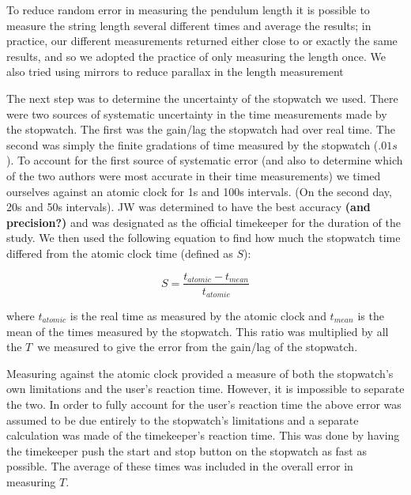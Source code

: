 \documentclass[iop]{emulateapj}
\def\T{$T$}
\begin{document}
To reduce random error in measuring the pendulum length 
it is possible to measure the string length several 
different times and average the results; in practice, our different 
measurements returned either close to or exactly the same results, and so 
we adopted the practice of only measuring the length once. We also tried using 
mirrors to reduce parallax in the length measurement

The next step was to determine the uncertainty of the stopwatch we used. 
There were two sources of systematic 
uncertainty in the time measurements made by the stopwatch.  The first was the 
gain/lag the stopwatch had over real time.  The second was simply the finite 
gradations of time measured by the stopwatch ($.01 s$).  To account for the 
first source of systematic error (and also to determine which of the two 
authors were most accurate in their time measurements) we timed 
ourselves against an atomic clock for 1s and 100s intervals.  (On the second
day, 20s and 50s intervals). JW 
was determined to have the best accuracy {\bf (and precision?)} and was 
designated as the official timekeeper for the duration of the study.  
We then used the following equation to find how much the stopwatch time
differed from the atomic clock time (defined as $S$):

\begin{equation}
\label{eq:S}
S=\frac{t_{atomic}-t_{mean}}{t_{atomic}} 
\end{equation}

where $t_{atomic}$ is the real time as measured by the 
atomic clock 
and $t_{mean}$ is the mean of the times measured by the 
stopwatch.  This ratio was multiplied by all the \T\ we measured to give
the error from the gain/lag of the stopwatch.

Measuring against the atomic clock provided a measure of both the stopwatch's 
own limitations and the user's reaction time.  However, it is impossible to 
separate the two.  In order to fully account for the user's reaction time the 
above error was assumed to be due entirely to the stopwatch's limitations and 
a separate calculation was made of the timekeeper's reaction time.  This was 
done by having the timekeeper push the start and stop button on the 
stopwatch as fast as possible.  The average of these times was included in 
the overall error in measuring \T.
\end{document}
